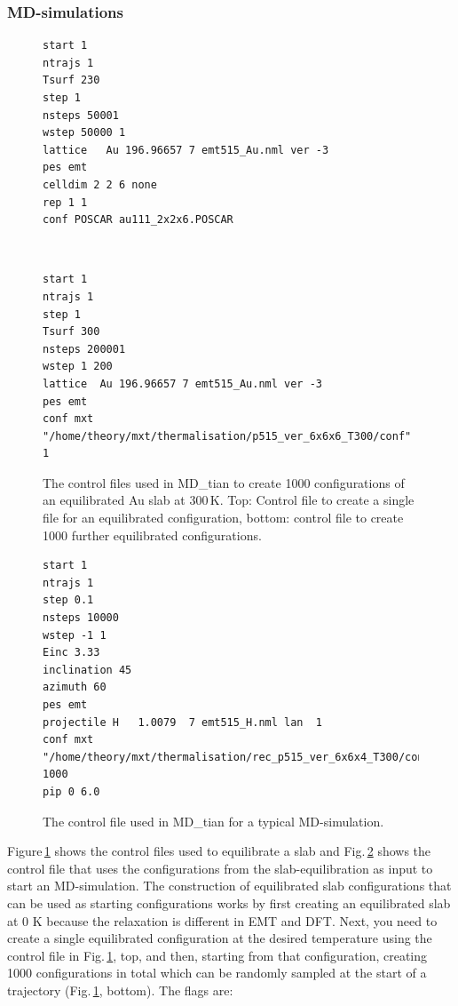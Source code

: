\documentclass[twoside, 11pt, titlepage, captions=nooneline, a4paper, headsepline]{scrbook}%
\newcommand{\9}{\mathrm}
\newcommand{\0}{\,\mathrm}
\begin{document}
\subsubsection{MD-simulations}
\begin{figure}[t!]
\begin{minipage}{0.9\textwidth}
\centering
\begin{verbatim}
start 1
ntrajs 1
Tsurf 230
step 1
nsteps 50001
wstep 50000 1
lattice   Au 196.96657 7 emt515_Au.nml ver -3
pes emt
celldim 2 2 6 none 
rep 1 1
conf POSCAR au111_2x2x6.POSCAR
\end{verbatim}
\end{minipage}
\begin{minipage}{0.9\textwidth}
\centering
\begin{verbatim}


\end{verbatim}
   
\end{minipage}
\begin{minipage}{0.9\textwidth}
\centering
\begin{verbatim}
start 1
ntrajs 1
step 1
Tsurf 300
nsteps 200001
wstep 1 200
lattice  Au 196.96657 7 emt515_Au.nml ver -3
pes emt
conf mxt "/home/theory/mxt/thermalisation/p515_ver_6x6x6_T300/conf" 1
\end{verbatim}
\end{minipage}
\caption{\label{Fig:mxt:thermalization}The control files used in MD\_tian to create 1000 configurations of an equilibrated Au slab at 300\,K. Top: Control file to create a single file for an equilibrated configuration, bottom: control file to create 1000 further equilibrated configurations.}
\end{figure}
\begin{figure}[b!]
\centering
\begin{verbatim}
start 1
ntrajs 1
step 0.1
nsteps 10000
wstep -1 1
Einc 3.33
inclination 45
azimuth 60
pes emt
projectile H   1.0079  7 emt515_H.nml lan  1
conf mxt "/home/theory/mxt/thermalisation/rec_p515_ver_6x6x4_T300/conf" 1000
pip 0 6.0
\end{verbatim}
\caption{\label{Fig:mxt:MDsimulation}The control file used in MD\_tian for a typical MD-simulation.}
\end{figure}
Figure\,\ref{Fig:mxt:thermalization} shows the control files used to equilibrate a slab and Fig.\,\ref{Fig:mxt:MDsimulation} shows the control file that uses the configurations from the slab-equilibration as input to start an MD-simulation. 
The construction of equilibrated slab configurations that can be used as starting configurations works by first creating an equilibrated slab at 0 K because the relaxation is different in EMT and DFT. Next, you need to create a single equilibrated configuration at the desired temperature using the control file in Fig.\,\ref{Fig:mxt:thermalization}, top, and then, starting from that configuration, creating 1000 configurations in total which can be randomly sampled at the start of a trajectory (Fig.\,\ref{Fig:mxt:thermalization}, bottom). 
The flags are:\\
\end{document}
